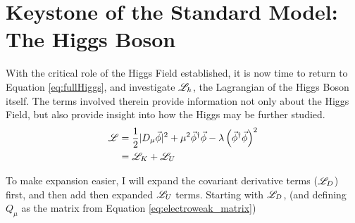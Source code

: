 \section{Keystone of the Standard Model: The Higgs Boson} \label{sec:higgs_boson}

    With the critical role of the Higgs Field established, it is now time to return to Equation \ref{eq:fullHiggs},
        and investigate $\mathscr{L}_h$, the Lagrangian of the Higgs Boson itself.
    The terms involved therein provide information not only about the Higgs Field,
        but also provide insight into how the Higgs may be further studied.
    \begin{equation} \begin{split}
        \mathscr{L} &= \frac{1}{2} |D_{\mu} \vec{\phi}|^2 +
            \mu^2 \vec{\phi}^\dag \vec{\phi} - \lambda \left( \vec{\phi}^\dag\vec{\phi} \right)^2
        \\&= \mathscr{L}_K + \mathscr{L}_U
    \end{split} \end{equation}
    
    To make expansion easier, I will expand the covariant derivative terms ($\mathscr{L}_D$) first,
        and then add then expanded $\mathscr{L}_U$ terms.
    Starting with $\mathscr{L}_D$, (and defining $Q_{\mu}$ as the matrix from Equation \ref{eq:electroweak_matrix})

